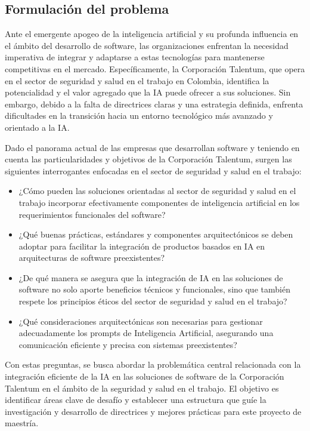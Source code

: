 \subsection{Formulación del problema}

Ante el emergente apogeo de la inteligencia artificial y su profunda influencia en el ámbito del desarrollo de software, las organizaciones enfrentan la necesidad imperativa de integrar y adaptarse a estas tecnologías para mantenerse competitivas en el mercado. Específicamente, la Corporación Talentum, que opera en el sector de seguridad y salud en el trabajo en Colombia, identifica la potencialidad y el valor agregado que la IA puede ofrecer a sus soluciones. Sin embargo, debido a la falta de directrices claras y una estrategia definida, enfrenta dificultades en la transición hacia un entorno tecnológico más avanzado y orientado a la IA.

Dado el panorama actual de las empresas que desarrollan software y teniendo en cuenta las particularidades y objetivos de la Corporación Talentum, surgen las siguientes interrogantes enfocadas en el sector de seguridad y salud en el trabajo:
\begin{itemize}
    \item ¿Cómo pueden las soluciones orientadas al sector de seguridad y salud en el trabajo incorporar efectivamente componentes de inteligencia artificial en los requerimientos funcionales del software?
    \item ¿Qué buenas prácticas, estándares y componentes arquitectónicos se deben adoptar para facilitar la integración de productos basados en IA en arquitecturas de software preexistentes?
    \item ¿De qué manera se asegura que la integración de IA en las soluciones de software no solo aporte beneficios técnicos y funcionales, sino que también respete los principios éticos del sector de seguridad y salud en el trabajo?
    \item ¿Qué consideraciones arquitectónicas son necesarias para gestionar adecuadamente los prompts de Inteligencia Artificial, asegurando una comunicación eficiente y precisa con sistemas preexistentes?
\end{itemize}

Con estas preguntas, se busca abordar la problemática central relacionada con la integración eficiente de la IA en las soluciones de software de la Corporación Talentum en el ámbito de la seguridad y salud en el trabajo. El objetivo es identificar áreas clave de desafío y establecer una estructura que guíe la investigación y desarrollo de directrices y mejores prácticas para este proyecto de maestría.
